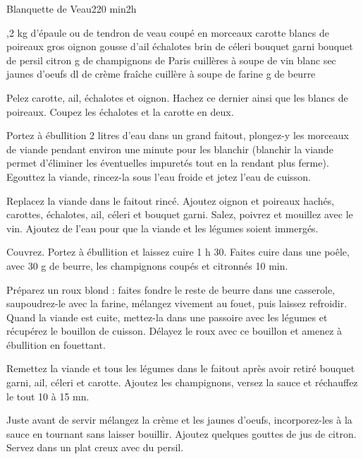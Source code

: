 \begin{recette}{Blanquette de Veau}{2}{20 min}{2h}
\begin{ingredients}
,2 kg d'épaule ou de tendron de veau coupé en morceaux
 carotte
 blancs de poireaux
 gros oignon
 gousse d'ail
 échalotes
 brin de céleri
 bouquet garni
 bouquet de persil
 citron
 g de champignons de Paris
 cuillères à soupe de vin blanc sec
 jaunes d'oeufs
 dl de crème fraîche
 cuillère à soupe de farine
 g de beurre
\end{ingredients}

\begin{preparation}
\etape Pelez carotte, ail, échalotes et oignon. Hachez ce dernier ainsi que les blancs de poireaux. Coupez les échalotes et la carotte en deux.

\etape Portez à ébullition 2 litres d'eau dans un grand faitout, plongez-y les morceaux de viande pendant environ une minute pour les blanchir (blanchir la viande permet d'éliminer les éventuelles impuretés tout en la rendant plus ferme). Egouttez la viande, rincez-la sous l'eau froide et jetez l'eau de cuisson.

\etape Replacez la viande dans le faitout rincé. Ajoutez oignon et poireaux hachés, carottes, échalotes, ail, céleri et bouquet garni. Salez, poivrez et mouillez avec le vin. Ajoutez de l'eau pour que la viande et les légumes soient immergés.

\etape Couvrez. Portez à ébullition et laissez cuire 1 h 30. Faites cuire dans une poêle, avec 30 g de beurre, les champignons coupés et citronnés 10 min.

\etape Préparez un roux blond : faites fondre le reste de beurre dans une casserole, saupoudrez-le avec la farine, mélangez vivement au fouet, puis laissez refroidir. Quand la viande est cuite, mettez-la dans une passoire avec les légumes et récupérez le bouillon de cuisson. Délayez le roux avec ce bouillon et amenez à ébullition en fouettant.

\etape Remettez la viande et tous les légumes dans le faitout après avoir retiré bouquet garni, ail, céleri et carotte. Ajoutez les champignons, versez la sauce et réchauffez le tout 10 à 15 mn.

\etape Juste avant de servir mélangez la crème et les jaunes d'oeufs, incorporez-les à la sauce en tournant sans laisser bouillir. Ajoutez quelques gouttes de jus de citron. Servez dans un plat creux avec du persil.
\end{preparation}



\end{recette}

